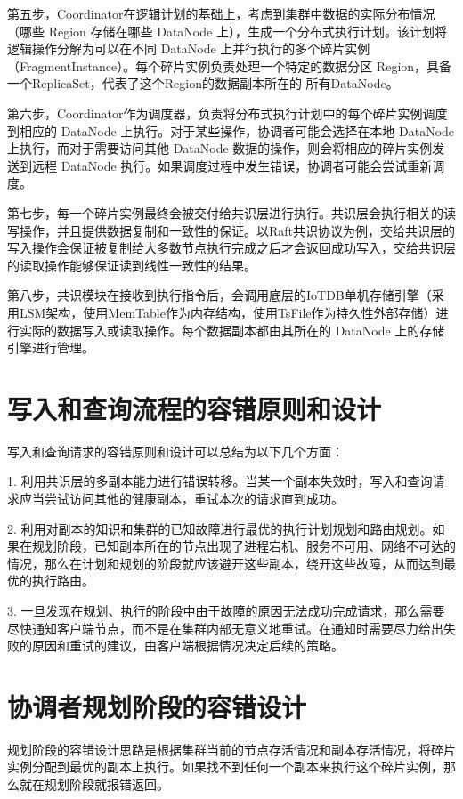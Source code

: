 第五步，Coordinator在逻辑计划的基础上，考虑到集群中数据的实际分布情况（哪些 Region 存储在哪些 DataNode 上），生成一个分布式执行计划。该计划将逻辑操作分解为可以在不同 DataNode 上并行执行的多个碎片实例（FragmentInstance）。每个碎片实例负责处理一个特定的数据分区 Region，具备一个ReplicaSet，代表了这个Region的数据副本所在的 所有DataNode。

第六步，Coordinator作为调度器，负责将分布式执行计划中的每个碎片实例调度到相应的 DataNode 上执行。对于某些操作，协调者可能会选择在本地 DataNode 上执行，而对于需要访问其他 DataNode 数据的操作，则会将相应的碎片实例发送到远程 DataNode 执行。如果调度过程中发生错误，协调者可能会尝试重新调度。

第七步，每一个碎片实例最终会被交付给共识层进行执行。共识层会执行相关的读写操作，并且提供数据复制和一致性的保证。以Raft共识协议为例，交给共识层的写入操作会保证被复制给大多数节点执行完成之后才会返回成功写入，交给共识层的读取操作能够保证读到线性一致性的结果。

第八步，共识模块在接收到执行指令后，会调用底层的IoTDB单机存储引擎（采用LSM架构，使用MemTable作为内存结构，使用TsFile\cite{zhao2024apachetsfile}作为持久性外部存储）进行实际的数据写入或读取操作。每个数据副本都由其所在的 DataNode 上的存储引擎进行管理。


\section{写入和查询流程的容错原则和设计}

写入和查询请求的容错原则和设计可以总结为以下几个方面：

1. 利用共识层的多副本能力进行错误转移。当某一个副本失效时，写入和查询请求应当尝试访问其他的健康副本，重试本次的请求直到成功。

2. 利用对副本的知识和集群的已知故障进行最优的执行计划规划和路由规划。如果在规划阶段，已知副本所在的节点出现了进程宕机、服务不可用、网络不可达的情况，那么在计划和规划的阶段就应该避开这些副本，绕开这些故障，从而达到最优的执行路由。

3. 一旦发现在规划、执行的阶段中由于故障的原因无法成功完成请求，那么需要尽快通知客户端节点，而不是在集群内部无意义地重试。在通知时需要尽力给出失败的原因和重试的建议，由客户端根据情况决定后续的策略。


\section{协调者规划阶段的容错设计}

规划阶段的容错设计思路是根据集群当前的节点存活情况和副本存活情况，将碎片实例分配到最优的副本上执行。如果找不到任何一个副本来执行这个碎片实例，那么就在规划阶段就报错返回。

